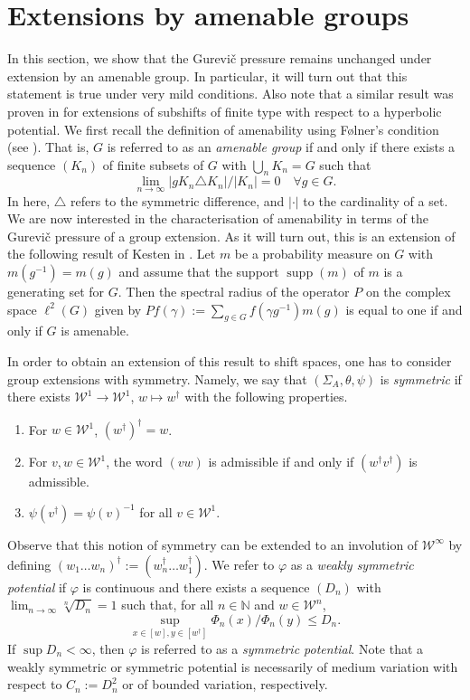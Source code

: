 \documentclass[10pt]{article}
\theoremstyle{mystyle}
\newcommand{\N}{\mathbb{N}}
\newcommand{\cW}{\mathcal{W}}
\newcommand{\te}{{\theta}}
\newcommand{\Sig}{{\Sigma}}
\newcommand{\1}{\mathbf{1}}
\DeclareMathOperator{\supp}{supp}
\begin{document}
\section{Extensions by amenable groups} 
In this section, we show that the Gurevi\v{c} pressure remains unchanged under extension by an amenable group. In particular, it will turn out that this statement is true under very mild conditions. Also note that a similar result was proven in \cite{Sharp:2007} for 
extensions of subshifts of finite type with respect to a hyperbolic potential.
We first recall the definition of amenability using F\o lner's condition (see \cite{Folner:1955}). That is, $G$ is referred to as an \emph{amenable group} if and only if there exists a sequence $(K_n)$ of finite subsets of $G$ with $\bigcup_n K_n = G$ such that 
  \[ \lim_{n \to \infty} |g K_n \triangle K_n|/ |K_n|=0 \quad \forall g \in G.\]
In here, $ \triangle$ refers to the symmetric difference, and $|\cdot|$ to the cardinality of a set. We are now interested in the characterisation of amenability in terms of the  Gurevi\v{c} pressure of a group extension. As it  will turn out, this is an extension of the following result of Kesten in \cite{Kesten:1959a}.  Let $m$ be a probability measure on $G$ with $m(g^{-1}) = m(g)$ and assume that the support $\supp(m)$ of $m$ is a generating set for $G$. Then the spectral radius of the operator $P$ on the complex space $\ell^2(G)$ given by $Pf(\gamma) := \sum_{g \in G} f(\gamma g^{-1}) m(g)$ is equal to one if and only if $G$ is amenable.

 In order to obtain an extension of this result to shift spaces, one has to consider group extensions with symmetry. Namely, we say that $(\Sig_A,\te,\psi)$ is \emph{symmetric} if there exists  $\cW^1 \to \cW^1$, $w \mapsto w^\dagger$ with the following properties.
\begin{enumerate}
  \item  For $w \in \cW^1$, $(w^\dagger)^\dagger=w$.
  \item  \label{def:2} For $v,w \in \cW^1$, the word $(vw)$ is admissible if and only if $(w^\dagger v^\dagger)$ is admissible.
  \item  $\psi(v^\dagger) = \psi(v)^{-1}$ for all $v \in \cW^1$.
\end{enumerate}
Observe that this notion of symmetry can be extended to an involution of $\cW^\infty$ by defining $(w_1\ldots w_n)^\dagger := (w_n^\dagger\ldots w_1^\dagger)$. We refer to $\varphi$ as a \emph{weakly symmetric potential} if $\varphi$ is continuous and there exists a sequence $(D_n)$ with $ \lim_{n\to \infty} \sqrt[n]{D_n} =1$ such that, for all $n \in \N$ and $w  \in \cW^n$,  
\[ \sup_{x \in [w], y \in [w^\dagger]} \Phi_n(x)/\Phi_n(y) \leq D_n.\]
 If $\sup D_n < \infty$, then $\varphi$ is referred to as a \emph{symmetric potential}. Note that a weakly symmetric  or symmetric potential is necessarily of medium variation with respect to $C_n:= D_n^2$ or of bounded variation, respectively.
\end{document}
